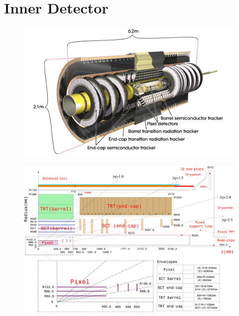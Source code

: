 
\section{Inner Detector}

\begin{figure}[hbtp]
\includegraphics[width=\fullfig]{figures/id_overview.pdf}
\caption{}
\label{fig:id_overview}
\end{figure}

\begin{figure}[hbtp]
\includegraphics[width=\fullfig]{figures/id_detail_schematic.pdf}
\caption{}
\label{fig:id_detail_schematic}
\end{figure}


